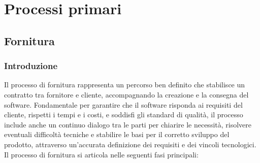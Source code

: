 \section{Processi primari}


\subsection{Fornitura}
\subsubsection{Introduzione}
Il processo di fornitura rappresenta un percorso ben definito che stabilisce un contratto tra fornitore e cliente, 
accompagnando la creazione e la consegna del software. 
Fondamentale per garantire che il software risponda ai requisiti del cliente, rispetti i tempi e i costi, 
e soddisfi gli standard di qualità, il processo include anche un continuo dialogo tra le parti per chiarire le necessità, 
risolvere eventuali difficoltà tecniche e stabilire le basi per il corretto sviluppo del prodotto, 
attraverso un'accurata definizione dei requisiti e dei vincoli tecnologici.
Il processo di fornitura si articola nelle seguenti fasi principali:

